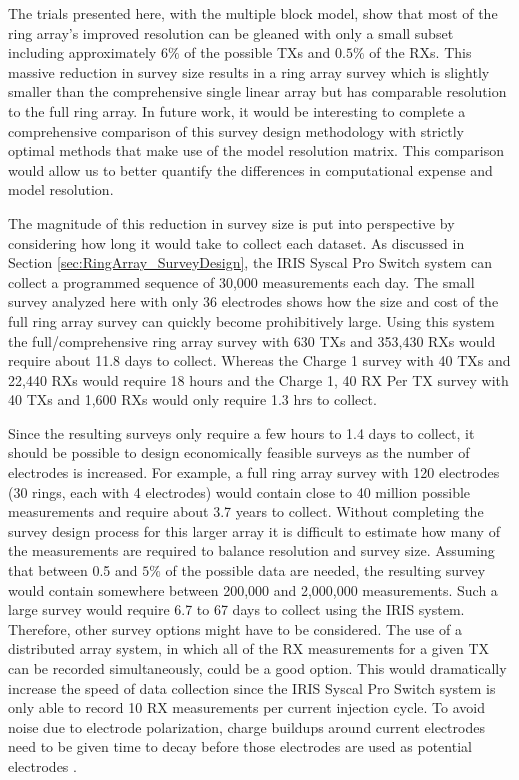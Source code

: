 \documentclass[preprint,authoryear,12pt]{elsarticle}
\newcommand{\midtilde}{\raisebox{-0.25\baselineskip}{\textasciitilde}}
\begin{document}
The trials presented here, with the multiple block model, show that most of the ring array's improved resolution can be gleaned with only a small subset including approximately $6\%$ of the possible TXs and $0.5\%$ of the RXs. This massive reduction in survey size results in a ring array survey which is slightly smaller than the comprehensive single linear array but has comparable resolution to the full ring array. In future work, it would be interesting to complete a comprehensive comparison of this survey design methodology with strictly optimal methods that make use of the model resolution matrix. This comparison would allow us to better quantify the differences in computational expense and model resolution.

The magnitude of this reduction in survey size is put into perspective by considering how long it would take to collect each dataset. As discussed in Section \ref{sec:RingArray_SurveyDesign}, the IRIS Syscal Pro Switch system can collect a programmed sequence of \midtilde30,000 measurements each day. The small survey analyzed here with only 36 electrodes shows how the size and cost of the full ring array survey can quickly become prohibitively large. Using this system the full/comprehensive ring array survey with 630 TXs and 353,430 RXs would require about 11.8 days to collect. Whereas the Charge 1 survey with 40 TXs and 22,440 RXs would require 18 hours and the Charge 1, 40 RX Per TX survey with 40 TXs and 1,600 RXs would only require 1.3 hrs to collect.

Since the resulting surveys only require a few hours to 1.4 days to collect, it should be possible to design economically feasible surveys as the number of electrodes is increased. For example, a full ring array survey with 120 electrodes (30 rings, each with 4 electrodes) would contain close to 40 million possible measurements and require about 3.7 years to collect. Without completing the survey design process for this larger array it is difficult to estimate how many of the measurements are required to balance resolution and survey size. Assuming that between 0.5 and $5\%$ of the possible data are needed, the resulting survey would contain somewhere between 200,000 and 2,000,000 measurements. Such a large survey would require 6.7 to 67 days to collect using the IRIS system. Therefore, other survey options might have to be considered. The use of a distributed array system, in which all of the RX measurements for a given TX can be recorded simultaneously, could be a good option. This would dramatically increase the speed of data collection since the IRIS Syscal Pro Switch system is only able to record 10 RX measurements per current injection cycle. To avoid noise due to electrode polarization, charge buildups around current electrodes need to be given time to decay before those electrodes are used as potential electrodes \citep{Dahlin2000,Merriam2005,Wilkinson2012}.
\end{document}
